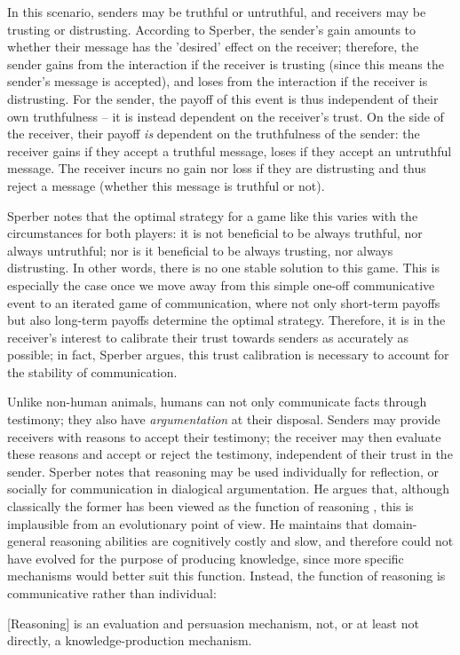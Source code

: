 In this scenario, senders may be truthful or untruthful, and receivers may be trusting or distrusting. According to Sperber, the sender's gain amounts to whether their message has the 'desired' effect on the receiver; therefore, the sender gains from the interaction if the receiver is trusting (since this means the sender's message is accepted), and loses from the interaction if the receiver is distrusting. For the sender, the payoff of this event is thus independent of their own truthfulness -- it is instead dependent on the receiver's trust. On the side of the receiver, their payoff \emph{is} dependent on the truthfulness of the sender: the receiver gains if they accept a truthful message, loses if they accept an untruthful message. The receiver incurs no gain nor loss if they are distrusting and thus reject a message (whether this message is truthful or not).

Sperber notes that the optimal strategy for a game like this varies with the circumstances for both players: it is not beneficial to be always truthful, nor always untruthful; nor is it beneficial to be always trusting, nor always distrusting. In other words, there is no one stable solution to this game.
This is especially the case once we move away from this simple one-off communicative event to an iterated game of communication, where not only short-term payoffs but also long-term payoffs determine the optimal strategy.
Therefore, it is in the receiver's interest to calibrate their trust towards senders as accurately as possible; in fact, Sperber argues, this trust calibration is necessary to account for the stability of communication.

Unlike non-human animals, humans can not only communicate facts through testimony; they also have \emph{argumentation} at their disposal. Senders may provide receivers with reasons to accept their testimony; the receiver may then evaluate these reasons and accept or reject the testimony, independent of their trust in the sender.
Sperber notes that reasoning may be used individually for reflection, or socially for communication in dialogical argumentation. He argues that, although classically the former has been viewed as the function of reasoning \citep[cf.][]{Novaes20}, this is implausible from an evolutionary point of view. He maintains that domain-general reasoning abilities are cognitively costly and slow, and therefore could not have evolved for the purpose of producing knowledge, since more specific mechanisms would better suit this function. Instead, the function of reasoning is communicative rather than individual:
\begin{quoting}
    {[Reasoning]} is an evaluation and persuasion mechanism, not, or at least not directly, a knowledge-production mechanism.
    \hfill \citep[p.~409]{Sperber01}
\end{quoting}

